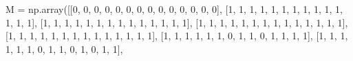 \documentclass[
]{article}
\newenvironment{Shaded}{\begin{snugshade}}{\end{snugshade}}
\newcommand{\DecValTok}[1]{\textcolor[rgb]{0.68,0.00,0.00}{#1}}
\newcommand{\NormalTok}[1]{\textcolor[rgb]{0.00,0.23,0.31}{#1}}
\newcommand{\OperatorTok}[1]{\textcolor[rgb]{0.37,0.37,0.37}{#1}}
\begin{document}
\begin{Shaded}
\begin{Highlighting}[]
\NormalTok{M }\OperatorTok{=}\NormalTok{ np.array([[}\DecValTok{0}\NormalTok{, }\DecValTok{0}\NormalTok{, }\DecValTok{0}\NormalTok{, }\DecValTok{0}\NormalTok{, }\DecValTok{0}\NormalTok{, }\DecValTok{0}\NormalTok{, }\DecValTok{0}\NormalTok{, }\DecValTok{0}\NormalTok{, }\DecValTok{0}\NormalTok{, }\DecValTok{0}\NormalTok{, }\DecValTok{0}\NormalTok{, }\DecValTok{0}\NormalTok{, }\DecValTok{0}\NormalTok{, }\DecValTok{0}\NormalTok{],}
\NormalTok{              [}\DecValTok{1}\NormalTok{, }\DecValTok{1}\NormalTok{, }\DecValTok{1}\NormalTok{, }\DecValTok{1}\NormalTok{, }\DecValTok{1}\NormalTok{, }\DecValTok{1}\NormalTok{, }\DecValTok{1}\NormalTok{, }\DecValTok{1}\NormalTok{, }\DecValTok{1}\NormalTok{, }\DecValTok{1}\NormalTok{, }\DecValTok{1}\NormalTok{, }\DecValTok{1}\NormalTok{, }\DecValTok{1}\NormalTok{, }\DecValTok{1}\NormalTok{],}
\NormalTok{              [}\DecValTok{1}\NormalTok{, }\DecValTok{1}\NormalTok{, }\DecValTok{1}\NormalTok{, }\DecValTok{1}\NormalTok{, }\DecValTok{1}\NormalTok{, }\DecValTok{1}\NormalTok{, }\DecValTok{1}\NormalTok{, }\DecValTok{1}\NormalTok{, }\DecValTok{1}\NormalTok{, }\DecValTok{1}\NormalTok{, }\DecValTok{1}\NormalTok{, }\DecValTok{1}\NormalTok{, }\DecValTok{1}\NormalTok{, }\DecValTok{1}\NormalTok{],}
\NormalTok{              [}\DecValTok{1}\NormalTok{, }\DecValTok{1}\NormalTok{, }\DecValTok{1}\NormalTok{, }\DecValTok{1}\NormalTok{, }\DecValTok{1}\NormalTok{, }\DecValTok{1}\NormalTok{, }\DecValTok{1}\NormalTok{, }\DecValTok{1}\NormalTok{, }\DecValTok{1}\NormalTok{, }\DecValTok{1}\NormalTok{, }\DecValTok{1}\NormalTok{, }\DecValTok{1}\NormalTok{, }\DecValTok{1}\NormalTok{, }\DecValTok{1}\NormalTok{],}
\NormalTok{              [}\DecValTok{1}\NormalTok{, }\DecValTok{1}\NormalTok{, }\DecValTok{1}\NormalTok{, }\DecValTok{1}\NormalTok{, }\DecValTok{1}\NormalTok{, }\DecValTok{1}\NormalTok{, }\DecValTok{1}\NormalTok{, }\DecValTok{1}\NormalTok{, }\DecValTok{1}\NormalTok{, }\DecValTok{1}\NormalTok{, }\DecValTok{1}\NormalTok{, }\DecValTok{1}\NormalTok{, }\DecValTok{1}\NormalTok{, }\DecValTok{1}\NormalTok{],}
\NormalTok{              [}\DecValTok{1}\NormalTok{, }\DecValTok{1}\NormalTok{, }\DecValTok{1}\NormalTok{, }\DecValTok{1}\NormalTok{, }\DecValTok{1}\NormalTok{, }\DecValTok{1}\NormalTok{, }\DecValTok{0}\NormalTok{, }\DecValTok{1}\NormalTok{, }\DecValTok{1}\NormalTok{, }\DecValTok{0}\NormalTok{, }\DecValTok{1}\NormalTok{, }\DecValTok{1}\NormalTok{, }\DecValTok{1}\NormalTok{, }\DecValTok{1}\NormalTok{],}
\NormalTok{              [}\DecValTok{1}\NormalTok{, }\DecValTok{1}\NormalTok{, }\DecValTok{1}\NormalTok{, }\DecValTok{1}\NormalTok{, }\DecValTok{1}\NormalTok{, }\DecValTok{1}\NormalTok{, }\DecValTok{0}\NormalTok{, }\DecValTok{1}\NormalTok{, }\DecValTok{1}\NormalTok{, }\DecValTok{0}\NormalTok{, }\DecValTok{1}\NormalTok{, }\DecValTok{0}\NormalTok{, }\DecValTok{1}\NormalTok{, }\DecValTok{1}\NormalTok{],}

\end{Highlighting}
\end{Shaded}
\end{document}
